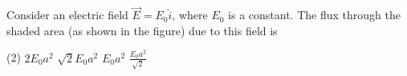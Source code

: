 
\item Consider an electric field \(\vec{E} = E_0 \hat{i}\), where \(E_0\) is a constant. The flux through the shaded area (as shown in the figure) due to this field is
    \begin{center}
    \end{center}
    \begin{tasks}(2)
        \task \(2E_0a^2\)
        \task \(\sqrt{2}E_0a^2\)
        \task \(E_0a^2\)
        \task \(\frac{E_0a^2}{\sqrt{2}}\)
    \end{tasks}

